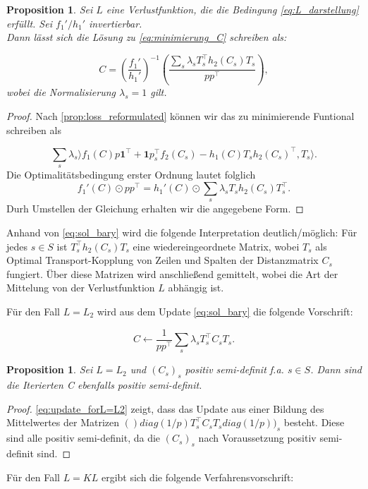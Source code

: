 \documentclass[twoside, 11pt,a4paper]{article}
\newtheorem{proposition}[theorem]{Proposition}
\numberwithin{equation}{section}
\begin{document}
	
	\begin{proposition}
		Sei $L$ eine Verlustfunktion, die die Bedingung \autoref{eq:L_darstellung} erfüllt. Sei $f_1'/h_1'$ invertierbar. \\
		Dann lässt sich die Lösung zu \autoref{eq:minimierung_C} schreiben als:
		
		\begin{equation}
		C = \left(\frac{f_1'}{h_1'}\right)^{-1} \left(\frac{\sum_s{\lambda_s T_s^\top h_2(C_s)T_s}}{pp^\top}\right),
		\label{eq:sol_bary}
		\end{equation}
		wobei die Normalisierung $\lambda_s = 1$ gilt.
	\end{proposition}
	\begin{proof}
		Nach \autoref{prop:loss_reformulated} können wir das zu minimierende Funtional schreiben als
		
		\begin{equation}
		\sum_s{\lambda_s \rangle f_1(C)p\boldsymbol{1}^\top + \boldsymbol{1}p_s^\top f_2(C_s) - h_1(C)T_s h_2(C_s)^\top , T_s \rangle}.
		\end{equation}
		Die Optimalitätsbedingung erster Ordnung lautet folglich 
		\begin{equation}
		f_1'(C) \odot pp^\top = h_1'(C) \odot \sum_s{\lambda_s T_sh_2(C_s)T_s^\top}.
		\end{equation}
		Durh Umstellen der Gleichung erhalten wir die angegebene Form.
	\end{proof}
	Anhand von \autoref{eq:sol_bary} wird die folgende Interpretation deutlich/möglich: Für jedes $s \in S$ ist $T_s^\top h_2(C_s)T_s$ eine wiedereingeordnete Matrix, wobei $T_s$ als Optimal Transport-Kopplung von Zeilen und Spalten der Distanzmatrix $C_s$ fungiert. Über diese Matrizen wird anschließend gemittelt, wobei die Art der Mittelung von der Verlustfunktion $L$ abhängig ist.
	
	Für den Fall $L=L_2$ wird aus dem Update \autoref{eq:sol_bary} die folgende Vorschrift:
	
	\begin{equation}
	C \leftarrow \frac{1}{pp^\top}\sum_s{\lambda_s T_s^\top C_s T_s}. \label{eq:update_forL=L2}
	\end{equation}
	
	\begin{proposition}
		Sei $L=L_2$ und $(C_s)_s$ positiv semi-definit f.a. $s \in S$. Dann sind die Iterierten C ebenfalls positiv semi-definit. 
	\end{proposition}
	\begin{proof}
		\autoref{eq:update_forL=L2} zeigt, dass das Update aus einer Bildung des Mittelwertes der Matrizen $()diag(1/p)T_s^\top C_s T_s diag(1/p))_s$ besteht. Diese sind alle positiv semi-definit, da die $(C_s)_s$ nach Voraussetzung positiv semi-definit sind.
	\end{proof}
	Für den Fall $L = KL$ ergibt sich die folgende Verfahrensvorschrift:
	
\end{document}
